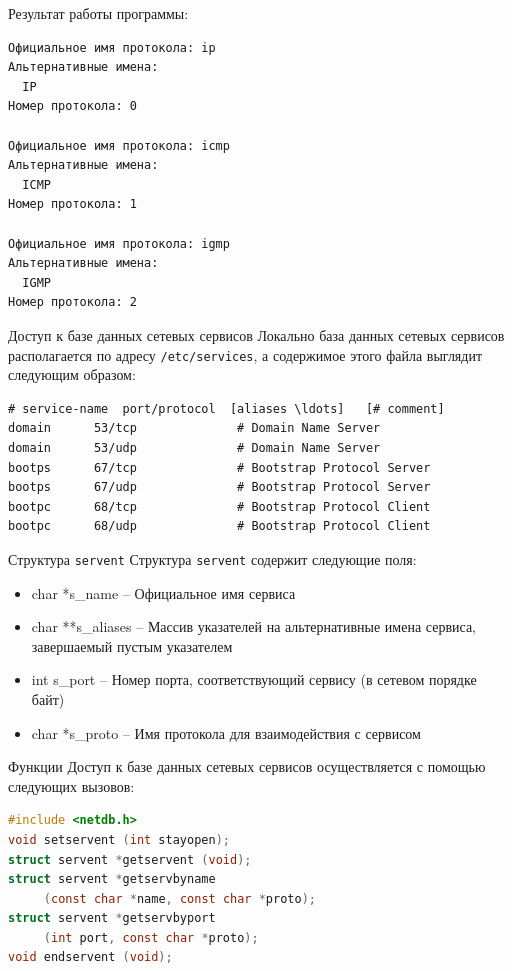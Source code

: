 \begin{frame}[fragile]
\tiny
\end{frame}

\begin{frame}[fragile]{}
Результат работы программы:
\scriptsize\begin{verbatim}
Официальное имя протокола: ip
Альтернативные имена:
  IP
Номер протокола: 0

Официальное имя протокола: icmp
Альтернативные имена:
  ICMP
Номер протокола: 1

Официальное имя протокола: igmp
Альтернативные имена:
  IGMP
Номер протокола: 2
\end{verbatim}
\normalsize
\end{frame}

\begin{frame}[fragile]{Доступ к базе данных сетевых сервисов}
Локально база данных сетевых сервисов располагается по адресу {\tt /etc/services}, а содержимое этого файла выглядит следующим образом:
\scriptsize\begin{verbatim}
# service-name  port/protocol  [aliases \ldots]   [# comment]
domain		53/tcp				# Domain Name Server
domain		53/udp				# Domain Name Server
bootps		67/tcp				# Bootstrap Protocol Server
bootps		67/udp				# Bootstrap Protocol Server
bootpc		68/tcp				# Bootstrap Protocol Client
bootpc		68/udp				# Bootstrap Protocol Client
\end{verbatim}
\end{frame}

\begin{frame}{Структура {\tt servent}}
Структура {\tt servent} содержит следующие поля:
\begin{itemize}
	\item char  *s\_name -- Официальное имя сервиса
	\item char **s\_aliases -- Массив указателей на альтернативные имена сервиса, завершаемый пустым указателем
	\item int    s\_port -- Номер порта, соответствующий сервису (в сетевом порядке байт)
	\item char  *s\_proto -- Имя протокола для взаимодействия с сервисом
\end{itemize}
\end{frame}

\begin{frame}[fragile]{Функции}
Доступ к базе данных сетевых сервисов осуществляется с помощью следующих вызовов:
\scriptsize\begin{lstlisting}[language=C]
#include <netdb.h>
void setservent (int stayopen);
struct servent *getservent (void);
struct servent *getservbyname 
     (const char *name, const char *proto);
struct servent *getservbyport 
     (int port, const char *proto);
void endservent (void);
\end{lstlisting}
\end{frame}

